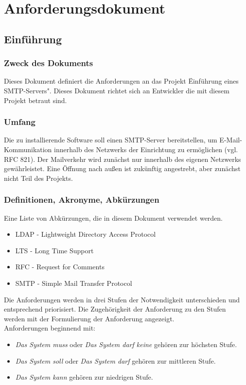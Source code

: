 \appendix
\renewcommand\chaptername{Anhang}


\chapter{Anforderungsdokument}
\label{ch:Anhang}

\section{Einführung}
\subsection{Zweck des Dokuments}
Dieses Dokument definiert die Anforderungen an das Projekt \"Einführung eines SMTP-Servers". 
Dieses Dokument richtet sich an Entwickler die mit diesem Projekt betraut sind.

\subsection{Umfang}
Die zu installierende Software soll einen SMTP-Server bereitstellen, um E-Mail-Kommunikation innerhalb des Netzwerks der Einrichtung zu ermöglichen (vgl. RFC 821). Der Mailverkehr wird zunächst nur innerhalb des eigenen Netzwerks gewährleistet. Eine Öffnung nach außen ist zukünftig angestrebt, aber zunächst nicht Teil des Projekts.

\subsection{Definitionen, Akronyme, Abkürzungen}
\label{ch:Definition}
Eine Liste von Abkürzungen, die in diesem Dokument verwendet werden.
\begin{itemize}
	\item LDAP - Lightweight Directory Access Protocol
	\item LTS - Long Time Support
	\item RFC - Request for Comments
	\item SMTP - Simple Mail Transfer Protocol
\end{itemize}

Die Anforderungen werden in drei Stufen der Notwendigkeit unterschieden und entsprechend priorisiert. Die Zugehörigkeit der Anforderung zu den Stufen werden mit der Formulierung der Anforderung angezeigt.\\
Anforderungen beginnend mit:
\begin{itemize}
	\item \textit{Das System muss} oder \textit{Das System darf keine} gehören zur höchsten Stufe.
	\item \textit{Das System soll} oder \textit{Das System darf} gehören zur mittleren Stufe.
	\item \textit{Das System kann} gehören zur niedrigen Stufe.
\end{itemize}

